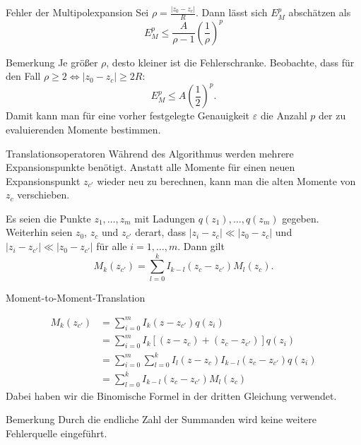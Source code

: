\documentclass[ngerman]{beamer}
\begin{document}
\begin{frame}{Fehler der Multipolexpansion}
Sei $\rho = \frac{|z_0-z_c|}{R}$. Dann lässt sich $E^p_M$ abschätzen als 
\begin{equation*}\label{rhomultipolerror}
E^p_M \leq \frac{A}{\rho-1}\left(\frac{1}{\rho}\right)^p
\end{equation*}
\begin{block}{Bemerkung}
Je größer $\rho$, desto kleiner ist die Fehlerschranke. Beobachte, dass für den Fall $\rho \geq 2 \Leftrightarrow |z_0-z_c| \geq 2 R$:
\begin{equation*}\label{halfmultipolerror}
E^p_M \leq A\left(\frac{1}{2}\right)^p.
\end{equation*}
Damit kann man für eine vorher festgelegte Genauigkeit $\varepsilon$ die Anzahl $p$ der zu evaluierenden Momente bestimmen.
\end{block}
\end{frame}

\begin{frame}{Translationsoperatoren}
Während des Algorithmus werden mehrere Expansionspunkte benötigt. Anstatt alle Momente für einen neuen Expansionspunkt $z_{c'}$ wieder neu zu berechnen, kann man die alten Momente von $z_c$ \glqq verschieben\grqq.
\begin{Satz}
Es seien die Punkte $z_1,\ldots, z_m$ mit Ladungen $q(z_1),\ldots,q(z_m)$ gegeben. Weiterhin seien $z_0$, $z_c$ und $z_{c'}$ derart, dass $|z_i-z_c| \ll |z_0-z_c|$ und $|z_i-z_{c'}| \ll |z_0-z_{c'}|$ für alle $i=1,\ldots,m$. Dann gilt
\begin{equation}\label{M2Meq}
M_k(z_{c'}) = \sum_{l=0}^k I_{k-l}(z_c-z_{c'})M_l(z_c).
\end{equation}
\end{Satz}
\end{frame}

\begin{frame}{Moment-to-Moment-Translation}
\footnotesize
\begin{Beweis}
\begin{align*}
M_k(z_{c'}) &= \sum_{i=0}^m I_k(z-z_{c'})q(z_i) \\
&=  \sum_{i=0}^m I_k\left[(z-z_c) + (z_c-z_{c'})\right]q(z_i) \\
&= \sum_{i=0}^m \sum_{l=0}^k I_l(z-z_c)I_{k-l}(z_c-z_{c'}) q(z_i)\\
&= \sum_{l=0}^k I_{k-l}(z_c-z_{c'})M_l(z_c)
\end{align*}
Dabei haben wir die Binomische Formel in der dritten Gleichung verwendet.
\end{Beweis}
\begin{block}{Bemerkung}
Durch die endliche Zahl der Summanden wird keine weitere Fehlerquelle eingeführt.
\end{block}
\end{frame}
\end{document}
